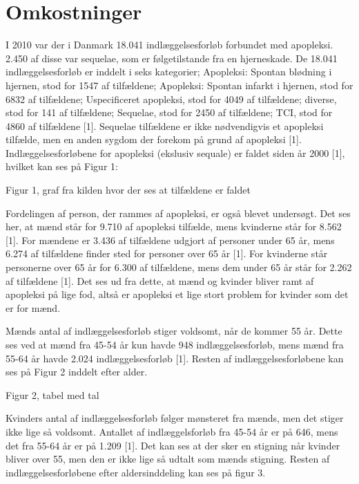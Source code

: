 \section{Omkostninger}

I 2010 var der i Danmark 18.041 indlæggelsesforløb forbundet med apopleksi. 2.450 af disse var sequelae, som er følgetilstande fra en hjerneskade. De 18.041 indlæggelsesforløb er inddelt i seks kategorier; Apopleksi: Spontan blødning i hjernen, stod for 1547 af tilfældene; Apopleksi: Spontan infarkt i hjernen, stod for 6832 af tilfældene; Uspecificeret apopleksi, stod for 4049 af tilfældene; diverse, stod for 141 af tilfældene; Sequelae, stod for 2450 af tilfældene; TCI, stod for 4860 af tilfældene [1]. Sequelae tilfældene er ikke nødvendigvis et apopleksi tilfælde, men en anden sygdom der forekom på grund af apopleksi [1]. Indlæggelsesforløbene for apopleksi (ekslusiv sequale) er faldet siden år 2000 [1], hvilket kan ses på Figur 1: %

Figur 1, graf fra kilden hvor der ses at tilfældene er faldet 

Fordelingen af person, der rammes af apopleksi, er også blevet undersøgt. Det ses her, at mænd står for 9.710 af apopleksi tilfælde, mens kvinderne står for 8.562 [1]. For mændene er 3.436 af tilfældene udgjort af personer under 65 år, mens 6.274 af tilfældene finder sted for personer over 65 år [1]. For kvinderne står personerne over 65 år for 6.300 af tilfældene, mens dem under 65 år står for 2.262 af tilfældene [1]. Det ses ud fra dette, at mænd og kvinder bliver ramt af apopleksi på lige fod, altså er apopleksi et lige stort problem for kvinder som det er for mænd. 

Mænds antal af indlæggelsesforløb stiger voldsomt, når de kommer 55 år. Dette ses ved at mænd fra 45-54 år kun havde 948 indlæggelsesforløb, mens mænd fra 55-64 år havde 2.024 indlæggelsesforløb [1]. Resten af indlæggelsesforløbene kan ses på Figur 2 inddelt efter alder.

Figur 2, tabel med tal

Kvinders antal af indlæggelsesforløb følger mønsteret fra mænds, men det stiger ikke lige så voldsomt. Antallet af indlæggelsforløb fra 45-54 år er på 646, mens det fra 55-64 år er på 1.209 [1]. Det kan ses at der sker en stigning når kvinder bliver over 55, men den er ikke lige så udtalt som mænds stigning. Resten af indlæggelsesforløbene efter aldersinddeling kan ses på figur 3.

